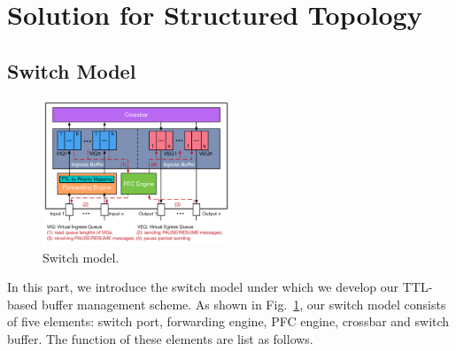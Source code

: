 \section{Solution for Structured Topology}\label{sec:sol}


\subsection{Switch Model}\label{subsec:model}

\begin{figure}
	\centering
		\includegraphics[width=0.5\textwidth] {figs/switch_model}
	\caption{Switch model.}\label{fig:switchmodel}

\end{figure}

In this part, we introduce the switch model under which we develop our TTL-based buffer management scheme. As shown in Fig.~\ref{fig:switchmodel},
our switch model consists of five elements: switch port, forwarding engine, PFC engine, crossbar and switch buffer. The function of these elements are list as follows.


